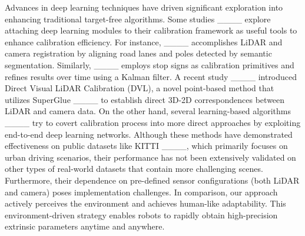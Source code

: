 Advances in deep learning techniques have driven significant exploration into enhancing traditional target-free algorithms. Some studies ____ explore attaching deep learning modules to their calibration framework as useful tools to enhance calibration efficiency. For instance, ____ accomplishes LiDAR and camera registration by aligning road lanes and poles detected by semantic segmentation. Similarly, ____ employs stop signs as calibration primitives and refines results over time using a Kalman filter. A recent study ____ introduced Direct Visual LiDAR Calibration (DVL), a novel point-based method that utilizes SuperGlue ____ to establish direct 3D-2D correspondences between LiDAR and camera data. 
On the other hand,  several learning-based algorithms ____ try to covert calibration process into more direct approaches by exploiting end-to-end deep learning networks.
Although these methods have demonstrated effectiveness on public datasets like KITTI ____, which primarily focuses on urban driving scenarios, their performance has not been extensively validated on other types of real-world datasets that contain more challenging scenes. Furthermore, their dependence on pre-defined sensor configurations (both LiDAR and camera) poses implementation challenges. 
In comparison, our approach actively perceives the environment and achieves human-like adaptability. This environment-driven strategy enables robots to rapidly obtain high-precision extrinsic parameters anytime and anywhere.